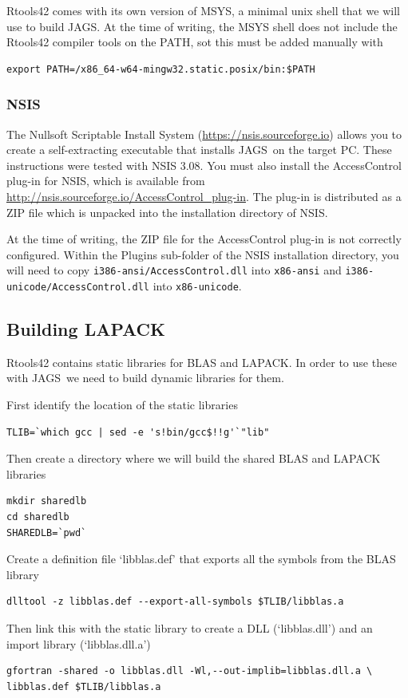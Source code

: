 \documentclass[11pt, a4paper, titlepage]{article}
\newcommand{\JAGS}{\textsf{JAGS}}
\newcommand{\file}[1]{{`\normalfont\textsf{#1}'}}
\begin{document}
Rtools42 comes with its own version of MSYS, a minimal unix shell
that we will use to build \JAGS. At the time of writing, the MSYS
shell does not include the Rtools42 compiler tools on the PATH,
sot this must be added manually with
\begin{verbatim}
export PATH=/x86_64-w64-mingw32.static.posix/bin:$PATH
\end{verbatim}

\subsubsection{NSIS}

The Nullsoft Scriptable Install System
(\url{https://nsis.sourceforge.io}) allows you to create a
self-extracting executable that installs \JAGS\ on the target PC.
These instructions were tested with NSIS 3.08.  You must also install
the AccessControl plug-in for NSIS, which is available from
\url{http://nsis.sourceforge.io/AccessControl_plug-in}. The plug-in
is distributed as a ZIP file which is unpacked into the installation
directory of NSIS.

At the time of writing, the ZIP file for the AccessControl plug-in is
not correctly configured. Within the Plugins sub-folder of the NSIS
installation directory, you will need to copy
\texttt{i386-ansi/AccessControl.dll} into \texttt{x86-ansi} and
\texttt{i386-unicode/AccessControl.dll} into \texttt{x86-unicode}.

\subsection{Building LAPACK}

Rtools42 contains static libraries for BLAS and LAPACK. In order
to use these with \JAGS\ we need to build dynamic libraries for them.

First identify the location of the static libraries
\begin{verbatim}
TLIB=`which gcc | sed -e 's!bin/gcc$!!g'`"lib"
\end{verbatim}
Then create a directory where we will build the shared BLAS and LAPACK
libraries
\begin{verbatim}
mkdir sharedlb
cd sharedlb
SHAREDLB=`pwd`
\end{verbatim}
Create a definition file \file{libblas.def} that exports all the
symbols from the BLAS library
\begin{verbatim}
dlltool -z libblas.def --export-all-symbols $TLIB/libblas.a
\end{verbatim}
Then link this with the static library to create a DLL
(\file{libblas.dll}) and an import library (\file{libblas.dll.a})
\begin{verbatim}
gfortran -shared -o libblas.dll -Wl,--out-implib=libblas.dll.a \
libblas.def $TLIB/libblas.a
\end{verbatim}
\end{document}
